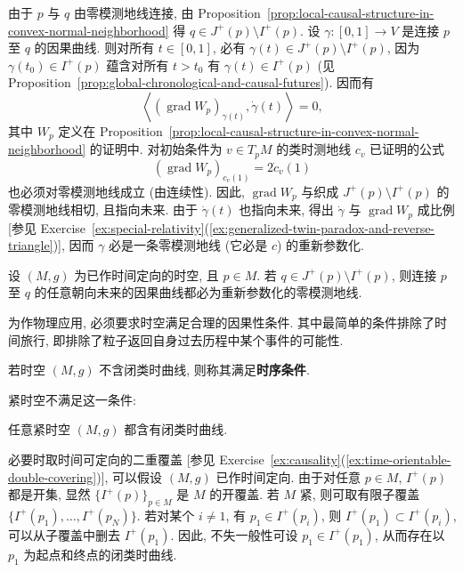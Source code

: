 \begin{RiemannProof}
由于 $p$ 与 $q$ 由零模测地线连接, 由 Proposition~\ref{prop:local-causal-structure-in-convex-normal-neighborhood} 得 $q\in J^+(p)\setminus I^+(p)$. 设 $\gamma:[0,1]\to V$ 是连接 $p$ 至 $q$ 的因果曲线. 则对所有 $t\in[0,1]$, 必有 $\gamma(t)\in J^+(p)\setminus I^+(p)$, 因为 $\gamma(t_0)\in I^+(p)$ 蕴含对所有 $t>t_0$ 有 $\gamma(t)\in I^+(p)$ (见 Proposition~\ref{prop:global-chronological-and-causal-futures}). 因而有
\[
  \left\langle(\operatorname{grad}W_p)_{\gamma(t)},\dot\gamma(t)\right\rangle=0,
\]
其中 $W_p$ 定义在 Proposition~\ref{prop:local-causal-structure-in-convex-normal-neighborhood} 的证明中. 对初始条件为 $v\in T_pM$ 的类时测地线 $c_v$ 已证明的公式
\[
  (\operatorname{grad}W_p)_{c_v(1)}=2\dot c_v(1)
\]
也必须对零模测地线成立 (由连续性). 因此, $\operatorname{grad}W_p$ 与织成 $J^+(p)\setminus I^+(p)$ 的零模测地线相切, 且指向未来. 由于 $\dot\gamma(t)$ 也指向未来, 得出 $\dot\gamma$ 与 $\operatorname{grad}W_p$ 成比例 [参见 Exercise~\ref{ex:special-relativity}(\ref{ex:generalized-twin-paradox-and-reverse-triangle})], 因而 $\gamma$ 必是一条零模测地线 (它必是 $c$) 的重新参数化.
\end{RiemannProof}

\begin{RiemannCorollary}\label{cor:global-boundary-causal-curves-are-null-geodesics}
设 $(M,g)$ 为已作时间定向的时空, 且 $p\in M$. 若 $q\in J^+(p)\setminus I^+(p)$, 则连接 $p$ 至 $q$ 的任意朝向未来的因果曲线都必为重新参数化的零模测地线.
\end{RiemannCorollary}

为作物理应用, 必须要求时空满足合理的因果性条件. 其中最简单的条件排除了时间旅行, 即排除了粒子返回自身过去历程中某个事件的可能性.

\begin{RiemannDefinition}\label{def:chronology-condition}
若时空 $(M,g)$ 不含闭类时曲线, 则称其满足\textbf{时序条件}.
\end{RiemannDefinition}

紧时空不满足这一条件:

\begin{RiemannProposition}\label{prop:compact-spacetime-has-closed-timelike-curves}
任意紧时空 $(M,g)$ 都含有闭类时曲线.
\end{RiemannProposition}

\begin{RiemannProof}
必要时取时间可定向的二重覆盖 [参见 Exercise~\ref{ex:causality}(\ref{ex:time-orientable-double-covering})], 可以假设 $(M,g)$ 已作时间定向. 由于对任意 $p\in M$, $I^+(p)$ 都是开集, 显然 $\{I^+(p)\}_{p\in M}$ 是 $M$ 的开覆盖. 若 $M$ 紧, 则可取有限子覆盖 $\{I^+(p_1),\ldots,I^+(p_N)\}$. 若对某个 $i\ne1$, 有 $p_1\in I^+(p_i)$, 则 $I^+(p_1)\subset I^+(p_i)$, 可以从子覆盖中删去 $I^+(p_1)$. 因此, 不失一般性可设 $p_1\in I^+(p_1)$, 从而存在以 $p_1$ 为起点和终点的闭类时曲线.
\end{RiemannProof}

